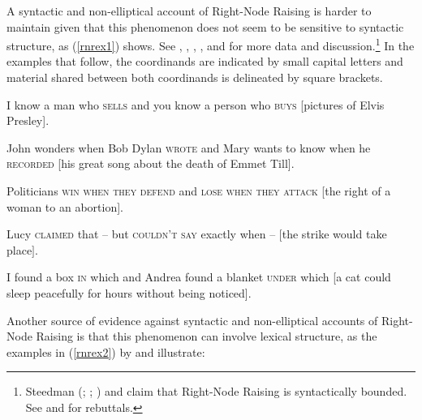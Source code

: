 \eal
{}
\zl


A syntactic and non-elliptical account of Right-Node Raising is harder to maintain given that this phenomenon does not seem to be sensitive to  syntactic structure, as (\ref{rnrex1}) shows. See 
\citet{bresnan74}, %
\citet[299]{wexlercull},  \citet[45]{grosu81}, \citet[--101]{mccawley}, and \citet[382, fn.\,30]{sab}
for more data and discussion.\footnote{%
  Steedman (\citeyear[]{steedman85}; \citeyear[]{gapsteed}; \citeyear[]{steedmanbook}) and
  \citet[183--184]{dowty88} claim that Right-Node Raising is syntactically bounded. See \citet[95]{phil} and \citet[]{Chaves2014a-u} for rebuttals.}
In the examples that follow, the coordinands are indicated by small capital letters and material shared between both coordinands is delineated by square brackets.


\eal
\label{rnrex1}
\ex  I know a man who \textsc{sells} and you know a person who \textsc{buys}
                     [pictures of Elvis Presley].

\ex John wonders when Bob Dylan
\textsc{wrote} and Mary wants to know when
  he
\textsc{recorded} [his great song about the death of Emmet Till].
 
 \ex Politicians \textsc{win when they defend} and \textsc{lose when they attack}
[the right of a woman to an abortion].

\ex Lucy \textsc{claimed} that -- but \textsc{couldn't say}
exactly when --  $[$the strike would take place$]$.
 
 \ex I found a box \textsc{in} which and Andrea found a blanket \textsc{under}
which [a cat could sleep peacefully for hours without being
noticed].
\zl

Another source of evidence against syntactic and non-elliptical accounts of Right-Node Raising is that this phenomenon can involve lexical structure,
as the examples in (\ref{rnrex2}) by \citet[1325, fn.\ 44]{rodney} and \citet{chaveslp,chavesrnr} illustrate:

